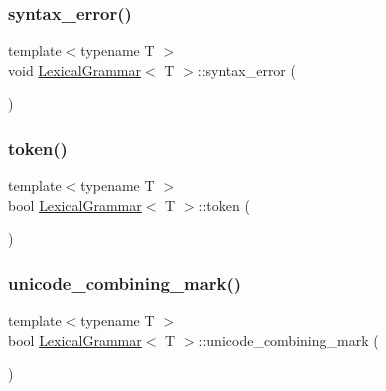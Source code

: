 \mbox{\label{class_lexical_grammar_acccc5eb7a8e4f460f4123049889d8e4b}} 
\subsubsection{\texorpdfstring{syntax\+\_\+error()}{syntax\_error()}}
{\footnotesize\ttfamily template$<$typename T $>$ \\
void \hyperlink{class_lexical_grammar}{Lexical\+Grammar}$<$ T $>$\+::syntax\+\_\+error (\begin{DoxyParamCaption}{ }\end{DoxyParamCaption})\hspace{0.3cm}{\ttfamily [inline]}}

\mbox{\label{class_lexical_grammar_ac728c2390815a0710dcf393763771f2c}} 
\subsubsection{\texorpdfstring{token()}{token()}}
{\footnotesize\ttfamily template$<$typename T $>$ \\
bool \hyperlink{class_lexical_grammar}{Lexical\+Grammar}$<$ T $>$\+::token (\begin{DoxyParamCaption}{ }\end{DoxyParamCaption})\hspace{0.3cm}{\ttfamily [inline]}}

\mbox{\label{class_lexical_grammar_ab16506f8bcae0aa05d7f6971d0355d9c}} 
\subsubsection{\texorpdfstring{unicode\+\_\+combining\+\_\+mark()}{unicode\_combining\_mark()}}
{\footnotesize\ttfamily template$<$typename T $>$ \\
bool \hyperlink{class_lexical_grammar}{Lexical\+Grammar}$<$ T $>$\+::unicode\+\_\+combining\+\_\+mark (\begin{DoxyParamCaption}{ }\end{DoxyParamCaption})\hspace{0.3cm}{\ttfamily [inline]}}

